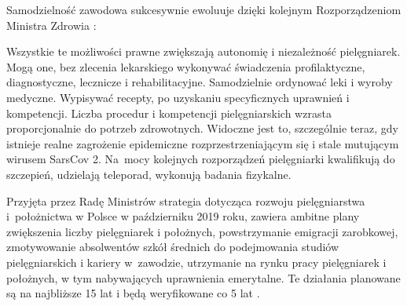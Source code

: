 \documentclass[a4paper,12pt,twoside,openright]{mwrep}
\begin{document}
Samodzielność zawodowa sukcesywnie ewoluuje dzięki kolejnym Rozporządzeniom Ministra Zdrowia \cite{akty}:

Wszystkie te możliwości prawne zwiększają autonomię i niezależność pielęgniarek. Mogą one, bez zlecenia lekarskiego wykonywać świadczenia profilaktyczne, diagnostyczne, lecznicze i rehabilitacyjne. Samodzielnie ordynować leki i wyroby medyczne. Wypisywać recepty, po uzyskaniu specyficznych uprawnień i kompetencji. Liczba procedur i kompetencji pielęgniarskich wzrasta proporcjonalnie do potrzeb zdrowotnych. Widoczne jest to, szczególnie teraz, gdy istnieje realne zagrożenie epidemiczne rozprzestrzeniającym się i stale mutującym wirusem SarsCov 2. Na~mocy kolejnych rozporządzeń pielęgniarki kwalifikują do szczepień, udzielają teleporad, wykonują badania fizykalne.

Przyjęta przez Radę Ministrów strategia dotycząca rozwoju pielęgniarstwa i~położnictwa w Polsce   w październiku 2019 roku, zawiera ambitne plany zwiększenia liczby pielęgniarek i położnych, powstrzymanie emigracji zarobkowej, zmotywowanie absolwentów szkół średnich do podejmowania studiów pielęgniarskich i kariery w~zawodzie, utrzymanie na rynku pracy pielęgniarek i położnych, w tym nabywających uprawnienia emerytalne. Te działania planowane są na najbliższe 15 lat i będą weryfikowane co 5 lat \cite{strategia}.
\end{document}
